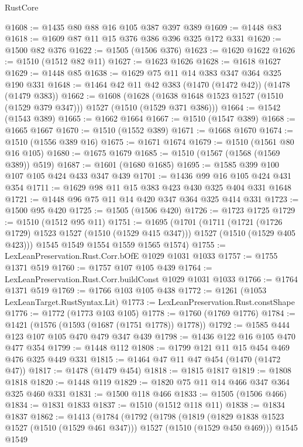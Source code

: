 \begin{lexlean}{RustCore}
\begin{coremodule}
@1608 := @1435 @80 @88 @16 @105 @387 @397 @389
@1609 := @1448 @83
@1618 := @1609 @87 @11 @15 @376 @386 @396 @325 @172 @331
@1620 := @1500 @82 @376
@1622 := @1505 (@1506 @376)
@1623 := @1620 @1622
@1626 := @1510 (@1512 @82 @11)
@1627 := @1623 @1626
@1628 := @1618 @1627
@1629 := @1448 @85
@1638 := @1629 @75 @11 @14 @383 @347 @364 @325 @190 @331
@1648 := @1464 @42 @11 @42 @383 (@1470 (@1472 @42)) (@1478 (@1479 @383))
@1662 := @1608
    (@1628 (@1638 @1648 @1523 @1527 (@1510 (@1529 @379 @347))) @1527 (@1510 (@1529 @371 @386)))
@1664 := @1542 (@1543 @389)
@1665 := @1662 @1664
@1667 := @1510 (@1547 @389)
@1668 := @1665 @1667
@1670 := @1510 (@1552 @389)
@1671 := @1668 @1670
@1674 := @1510 (@1556 @389 @16)
@1675 := @1671 @1674
@1679 := @1510 (@1561 @80 @16 @105)
@1680 := @1675 @1679
@1685 := @1510 (@1567 (@1568 (@1569 @389)) @519)
@1687 := @1601 (@1680 @1685)
@1695 := @1585 @399 @100 @107 @105 @424 @433 @347 @439
@1701 := @1436 @99 @16 @105 @424 @431 @354
@1711 := @1629 @98 @11 @15 @383 @423 @430 @325 @404 @331 @1648
@1721 := @1448 @96 @75 @11 @14 @420 @347 @364 @325 @414 @331
@1723 := @1500 @95 @420
@1725 := @1505 (@1506 @420)
@1726 := @1723 @1725
@1729 := @1510 (@1512 @95 @11)
@1751 := @1695
    (@1701
      (@1711
        (@1721 (@1726 @1729) @1523 @1527 (@1510 (@1529 @415 @347)))
        @1527
        (@1510 (@1529 @405 @423)))
      @1545
      @1549
      @1554
      @1559
      @1565
      @1574)
@1755 := LexLeanPreservation.Rust.Corr.bOfE @1029 @1031 @1033
@1757 := @1755 @1371 @519
@1760 := @1757 @107 @105 @439
@1764 := LexLeanPreservation.Rust.Corr.buildConst @1029 @1031 @1033
@1766 := @1764 @1371 @519
@1769 := @1766 @103 @105 @438
@1772 := @1261 (@1053 LexLeanTarget.RustSyntax.Lit)
@1773 := LexLeanPreservation.Rust.constShape
@1776 := @1772 (@1773 @103 @105)
@1778 := @1760 (@1769 @1776)
@1784 := @1421 (@1576 (@1593 (@1687 (@1751 @1778)) @1778))
@1792 := @1585 @444 @123 @107 @105 @470 @479 @347 @439
@1798 := @1436 @122 @16 @105 @470 @477 @354
@1799 := @1448 @112
@1808 := @1799 @121 @11 @15 @454 @469 @476 @325 @449 @331
@1815 := @1464 @47 @11 @47 @454 (@1470 (@1472 @47))
@1817 := @1478 (@1479 @454)
@1818 := @1815 @1817
@1819 := @1808 @1818
@1820 := @1448 @119
@1829 := @1820 @75 @11 @14 @466 @347 @364 @325 @460 @331
@1831 := @1500 @118 @466
@1833 := @1505 (@1506 @466)
@1834 := @1831 @1833
@1837 := @1510 (@1512 @118 @11)
@1838 := @1834 @1837
@1862 := @1413
    (@1784
      (@1792
        (@1798
          (@1819
            (@1829 @1838 @1523 @1527 (@1510 (@1529 @461 @347)))
            @1527
            (@1510 (@1529 @450 @469)))
          @1545
          @1549

\end{coremodule}
\end{lexlean}
